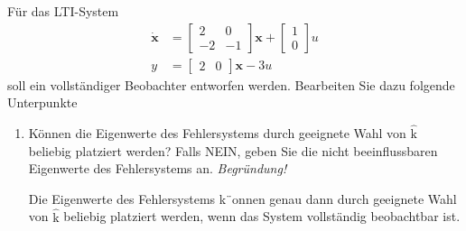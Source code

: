 \documentclass{article}
\begin{document}
\begin{task}
Für das LTI-System
\[\begin{aligned} \dot{\mathbf{x}} &=\left[\begin{array}{cc}{2} & {0} \\ {-2} & {-1}\end{array}\right] \mathbf{x}+\left[\begin{array}{c}{1} \\ {0}\end{array}\right] u \\ y &=\left[\begin{array}{cc}{2} & {0}\end{array}\right] \mathbf{x}-3 u \end{aligned}\]
soll ein vollständiger Beobachter entworfen werden. Bearbeiten Sie dazu folgende Unterpunkte
\begin{enumerate}[i]
    \item Können die Eigenwerte des Fehlersystems durch geeignete Wahl von $\hat{\mathrm{k}}$ beliebig
platziert werden? Falls NEIN, geben Sie die nicht beeinflussbaren Eigenwerte des
Fehlersystems an. \emph{Begründung!}
\begin{solution}
Die Eigenwerte des Fehlersystems k¨onnen genau dann durch geeignete Wahl von $\hat{\mathrm{k}}$ beliebig platziert werden, wenn das System vollständig beobachtbar ist.


\end{solution}
\end{enumerate}
\end{task}
\end{document}
